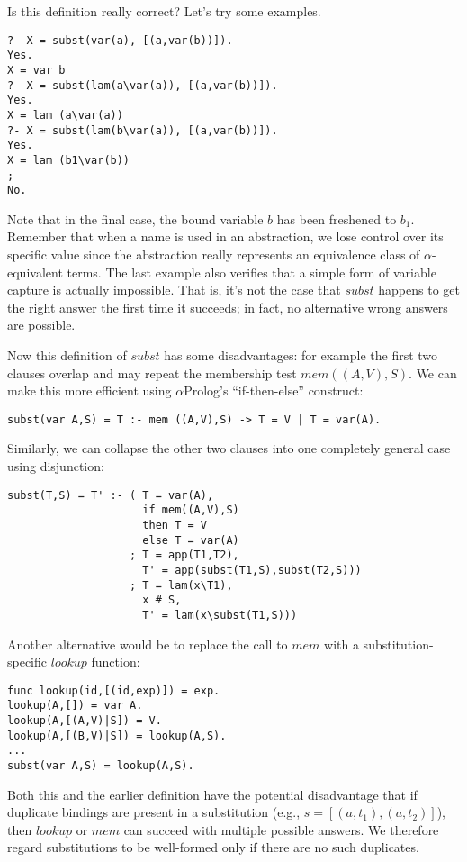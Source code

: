 \documentclass[draft,12pt]{report}
\newcommand{\aprolog}{$\alpha${Prolog}\xspace}
\begin{document}
Is this definition really correct? Let's try some examples.
\begin{verbatim}
?- X = subst(var(a), [(a,var(b))]).
Yes.
X = var b
?- X = subst(lam(a\var(a)), [(a,var(b))]).
Yes. 
X = lam (a\var(a))
?- X = subst(lam(b\var(a)), [(a,var(b))]).
Yes.
X = lam (b1\var(b))
;
No.
\end{verbatim}
Note that in the final case, the bound variable $b$ has been freshened
to $b_1$.  Remember that when a name is used in an abstraction, we
lose control over its specific value since the abstraction really
represents an equivalence class of $\alpha$-equivalent terms.  The
last example also verifies that a simple form of variable capture is
actually impossible.  That is, it's not the case that $subst$ happens
to get the right answer the first time it succeeds; in fact, no
alternative wrong answers are possible.

Now this definition of $subst$ has some disadvantages: for example the
first two clauses overlap and may repeat the membership test $mem
((A,V),S)$.  We can make this more efficient using \aprolog's
``if-then-else'' construct:
\begin{verbatim}
subst(var A,S) = T :- mem ((A,V),S) -> T = V | T = var(A).
\end{verbatim}
Similarly, we can collapse the other two clauses into one completely
general case using disjunction:
\begin{verbatim}
subst(T,S) = T' :- ( T = var(A), 
                     if mem((A,V),S) 
                     then T = V 
                     else T = var(A)
                   ; T = app(T1,T2), 
                     T' = app(subst(T1,S),subst(T2,S)))
                   ; T = lam(x\T1), 
                     x # S, 
                     T' = lam(x\subst(T1,S)))
\end{verbatim}

Another alternative would be to replace the call to $mem$ with a
substitution-specific $lookup$ function:
\begin{verbatim}
func lookup(id,[(id,exp)]) = exp.
lookup(A,[]) = var A.
lookup(A,[(A,V)|S]) = V.
lookup(A,[(B,V)|S]) = lookup(A,S).
...
subst(var A,S) = lookup(A,S).
\end{verbatim}

Both this and the earlier definition have the potential disadvantage
that if duplicate bindings are present in a substitution (e.g., $s =
[(a,t_1),(a,t_2)]$), then $lookup$ or $mem$ can succeed with multiple
possible answers.  We therefore regard substitutions to be well-formed
only if there are no such duplicates.
\end{document}
